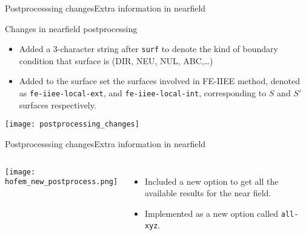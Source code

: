 %
%

  
  \begin{frame}[allowframebreaks]{Postprocesssing  changes}{Extra information in
      nearfield}

    \begin{block}{Changes in nearfield postprocessing}
      \begin{itemize}
      \item Added a 3-character string after \texttt{surf} to denote
        the kind of boundary condition that surface is (DIR, NEU, NUL,
        ABC,\ldots)
      \item Added to the surface set the surfaces involved in FE-IIEE
        method, denoted as \texttt{fe-iiee-local-ext}, and
        \texttt{fe-iiee-local-int}, corresponding to $S$ and $S'$
        surfaces respectively.
      \end{itemize}

    \end{block}

    \framebreak %

    \begin{center}
      \texttt{[image: postprocessing\_changes]} 
    \end{center}

    
  \end{frame}

  
  \begin{frame}[allowframebreaks]{Postprocesssing  changes}{Extra information in
      nearfield}

    \begin{columns}
       \centering
      {\texttt{[image: hofem\_new\_postprocess.png]}}
      {
        \begin{itemize}
        \item Included a new option to get all the available results for the 
          near field.
        \item Implemented as a new option called \texttt{all-xyz}.
        \end{itemize}
      }
    \end{columns}
    
  \end{frame}
    

